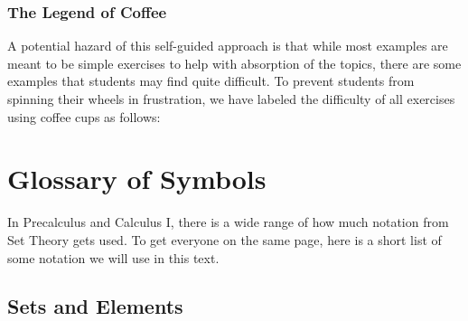 \subsubsection*{The Legend of Coffee}

A potential hazard of this self-guided approach is that while most examples are meant to be simple exercises to help with absorption of the topics, there are some examples that students may find quite difficult.  To prevent students from spinning their wheels in frustration, we have labeled the difficulty of all exercises using coffee cups as follows:

\begin{center}
\end{center}

\newpage

\section*{Glossary of Symbols}

In Precalculus and Calculus I, there is a wide range of how much notation from Set Theory gets used.  To get everyone on the same page, here is a short list of some notation we will use in this text.

\subsection*{Sets and Elements} 

